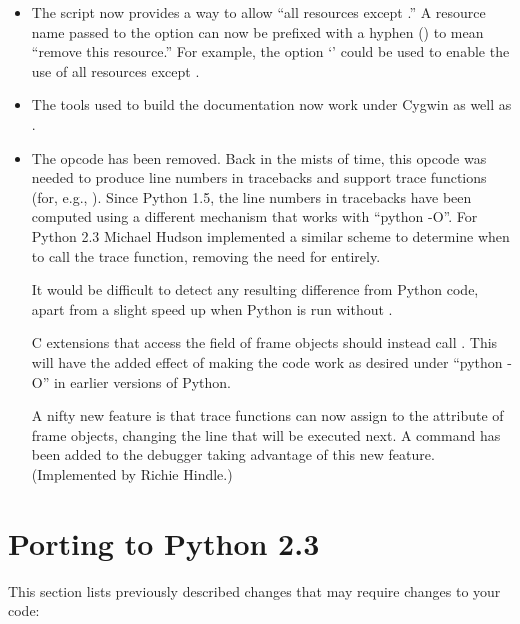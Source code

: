 \documentclass{howto}
\begin{document}
\begin{itemize}

\item The  script now provides a way to allow ``all
resources except .''  A resource name passed to the
 option can now be prefixed with a hyphen
(\character{-}) to mean ``remove this resource.''  For example, the
option `' could be used to enable the
use of all resources except .

\item The tools used to build the documentation now work under Cygwin
as well as \UNIX.

\item The  opcode has been removed.  Back in the
mists of time, this opcode was needed to produce line numbers in
tracebacks and support trace functions (for, e.g., ).
Since Python 1.5, the line numbers in tracebacks have been computed
using a different mechanism that works with ``python -O''.  For Python
2.3 Michael Hudson implemented a similar scheme to determine when to
call the trace function, removing the need for 
entirely.

It would be difficult to detect any resulting difference from Python
code, apart from a slight speed up when Python is run without
.

C extensions that access the  field of frame objects
should instead call .
This will have the added effect of making the code work as desired
under ``python -O'' in earlier versions of Python.

A nifty new feature is that trace functions can now assign to the
 attribute of frame objects, changing the line that
will be executed next.  A  command has been added to the
 debugger taking advantage of this new feature.
(Implemented by Richie Hindle.)

\end{itemize}


\section{Porting to Python 2.3}

This section lists previously described changes that may require
changes to your code:
\end{document}
